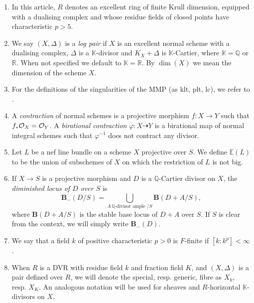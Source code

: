 	\begin{enumerate}
		\item In this article, $R$ denotes an excellent ring of finite Krull dimension, equipped with a dualising complex and whose residue fields of closed points have characteristic $p>5$.
		\item We say $(X, \Delta)$ is a \emph{log pair} if $X$ is an excellent normal scheme with a dualising complex, $\Delta$ is a $\mathbb{K}$-divisor and $K_X+\Delta$ is $\mathbb{K}$-Cartier, where $\mathbb{K}=\mathbb{Q}$ or $\mathbb{R}$.  When not specified we default to $\mathbb{K}=\mathbb{R}$. By $\dim(X)$ we mean the dimension of the scheme $X$.
		\item For the definitions of the singularities of the MMP (as klt, plt, lc), we refer to \cite{kk-singbook,bhatt2020}.
		\item A \textit{contraction} of normal schemes is a projective morphism $f\colon X\to Y$ such that $f_*\mathcal{O}_X=\mathcal{O}_Y$.  A \emph{birational contraction} $\varphi \colon X \dashrightarrow Y$ is a birational map of normal integral schemes such that $\varphi^{-1}$ does not contract any divisor.
		\item Let $L$ be a nef line bundle on a scheme $X$ projective over $S$. We define $\mathbb{E}(L)$ to be the union of subschemes of $X$ on which the restriction of $L$ is not big.
		\item If $X \to S$ is a projective morphism and $D$ is a $\mathbb{Q}$-Cartier divisor on $X$, the \emph{diminished locus of $D$ over $S$}  is  $$\mathbf{B}_{-}(D/S) = \bigcup_{A \, \mathbb{Q}\text{-divisor} \text{ ample }/S} \mathbf{B}(D+A/S),$$ where $\mathbf{B}(D+A/S)$ is the stable base locus of $D+A$ over $S$. If $S$ is clear from the context, we will simply write $\mathbf{B}_{-}(D)$.
		\item We say that a field $k$ of positive characteristic $p>0$ is $F$-finite if $[k:k^p]< \infty$.
		\item When $R$ is a DVR with residue field $k$ and fraction field $K$, and $(X,\Delta)$ is a pair defined over $R$, we will denote the special, resp. generic, fibre as $X_{k}$, resp. $X_K$. An analogous notation will be used for sheaves and $R$-horizontal $\mathbb{K}$-divisors on $X$.
	\end{enumerate}
	
